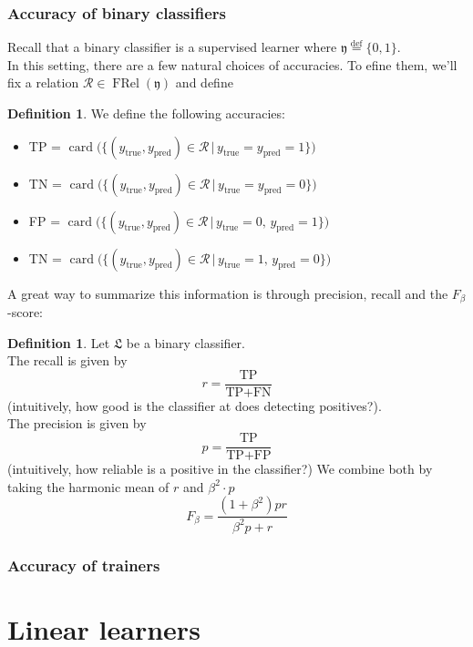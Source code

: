 \documentclass{book}
\theoremstyle{plain}
\theoremstyle{definition}
\newtheorem{definition}[corollary]{Definition}
\DeclareMathOperator{\card}{card}
\newcommand{\define}{\stackrel{\operatorname{def}}{=}}
\newcommand{\f}[1]{\mathfrak{#1}}
\DeclareMathOperator{\FRel}{FRel}
\DeclareMathOperator{\pred}{pred}
\renewcommand{\r}[1]{\mathcal{#1}}
\DeclareMathOperator{\true}{true}
\renewcommand{\r}[1]{\mathcal{#1}}
\begin{document}
\subsection{Accuracy of binary classifiers}
Recall that a binary classifier is a supervised learner where $\f{y}\define \{0,1\}$.\\
In this setting, there are a few natural choices of accuracies. To efine them, we'll fix a relation $\r{R}\in \FRel(\f{y})$ and define
\begin{definition}\label{sl:def:binacc}
We define the following accuracies:
\begin{itemize}
\item TP = $\card\big(\big\{(y_{\true},y_{\pred}) \in \r{R}\, \vert\, y_{\true}=y_{\pred} = 1 \big\}\big)$
 \item TN = $\card\big(\big\{(y_{\true},y_{\pred}) \in \r{R} \, \vert\, y_{\true}=y_{\pred} = 0 \big\}\big)$
 \item FP = $\card\big(\big\{(y_{\true},y_{\pred}) \in \r{R}\, \vert\, y_{\true}=0,\, y_{\pred} = 1 \big\}\big)$
 \item TN = $\card\big(\big\{(y_{\true},y_{\pred}) \in \r{R}\, \vert\, y_{\true}=1,\, y_{\pred} = 0 \big\}\big)$
\end{itemize}
\end{definition}
A great way to summarize this information is through precision, recall and the $F_\beta$-score:
\begin{definition}
Let $\f{L}$ be a binary classifier.\\
The recall is given by
\[
r=\frac{\text{TP}}{\text{TP}+\text{FN}}
\]
(intuitively, how good is the classifier at does detecting positives?).\\
The precision is given by
\[
p= \frac{\text{TP}}{\text{TP}+\text{FP}}
\]
(intuitively, how reliable is a positive in the classifier?)
We combine both by taking the harmonic mean of $r$ and $\beta^2\cdot p$
\[
F_\beta = \frac{(1+\beta^2)pr}{\beta^2p+r}
\]
\end{definition}

\subsection{Accuracy of trainers}








\chapter{Linear learners}
\end{document}
